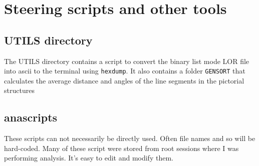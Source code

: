 \documentclass[12pt]{article}
\begin{document}
\section{Steering scripts and other tools}
\subsection{UTILS directory}
The UTILS directory contains a script to convert the binary list mode LOR file into ascii to the terminal using {\tt hexdump}. It also contains a folder {\tt GENSORT} that calculates the average distance and angles of the line segments in the pictorial structures
\subsection{anascripts}
These scripts can not necessarily be directly used. Often file names and so will be hard-coded. Many of these script were stored from root sessions where I was performing analysis. It's easy to edit and modify them.
\end{document}

